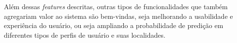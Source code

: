 Além dessas \textit{features} descritas, outras tipos de funcionalidades que também agregariam valor ao sistema são bem-vindas, seja melhorando a usabilidade e experiência do usuário, ou seja ampliando a probabilidade de predição em diferentes tipos de perfis de usuário e suas localidades.



